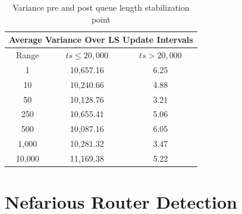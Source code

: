 \begin{table}[H]
    \centering
    \begin{tabular}{||c c c||}
        \hline
        \multicolumn{3}{||c||}{Average Variance Over LS Update Intervals} \\ [0.5ex]
        \hline
        \multicolumn{1}{||c|}{Range} & $ts \leq 20,000$ & $ts > 20,000$ \\ [0.5ex]
        \hline\hline
        1       & 10,657.16 & 6.25 \\ 
        10      & 10,240.66 & 4.88 \\
        50      & 10,128.76 & 3.21 \\
        250     & 10,655.41 & 5.06 \\
        500     & 10,087.16 & 6.05 \\
        1,000   & 10,281.32 & 3.47 \\
        10,000  & 11,169.38 & 5.22 \\ [1ex] 
        \hline
    \end{tabular}
    \caption{Variance pre and post queue length stabilization point}
\end{table}

\section{Nefarious Router Detection}
\label{sec:Rnefarouterdetection}

